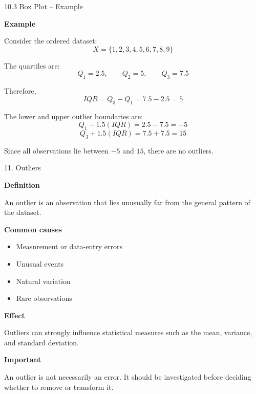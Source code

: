 
\begin{frame}{10.3 Box Plot -- Example}

\textbf{Example}

Consider the ordered dataset:
\[
X=\{1,2,3,4,5,6,7,8,9\}
\]

The quartiles are:
\[
Q_1=2.5,\qquad Q_2=5,\qquad Q_3=7.5
\]

Therefore,
\[
IQR=Q_3-Q_1
=
7.5-2.5
=
5
\]

\vspace{0.1cm}

The lower and upper outlier boundaries are:
\[
Q_1-1.5(IQR)
=
2.5-7.5
=
-5
\]
\[
Q_3+1.5(IQR)
=
7.5+7.5
=
15
\]

Since all observations lie between $-5$ and $15$,
there are no outliers.

\end{frame}



\begin{frame}{11. Outliers}

\textbf{Definition}

An outlier is an observation that lies unusually far from
the general pattern of the dataset.

\textbf{Common causes}

\begin{itemize}
    \item Measurement or data-entry errors
    \item Unusual events
    \item Natural variation
    \item Rare observations
\end{itemize}

\textbf{Effect}

Outliers can strongly influence statistical measures such as
the mean, variance, and standard deviation.

\textbf{Important}

An outlier is not necessarily an error. It should be investigated
before deciding whether to remove or transform it.

\end{frame}

